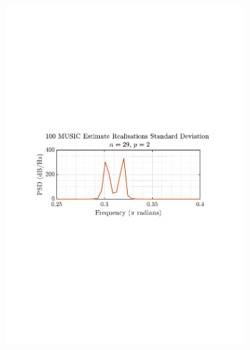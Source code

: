 \documentclass[12pt]{article}
\numberwithin{equation}{section}
\begin{document}
\begin{figure}[H]
\begin{subfigure}{0.49\textwidth}
			\includegraphics[trim={2.2cm 11cm 3.15cm  11.2cm}, clip, width=\textwidth]{../MATLAB/figures/q1_3e_fig04.pdf} 
		\end{subfigure}
		\begin{subfigure}{0.49\textwidth}
			\centering

\end{subfigure}
\end{figure}
\end{document}
